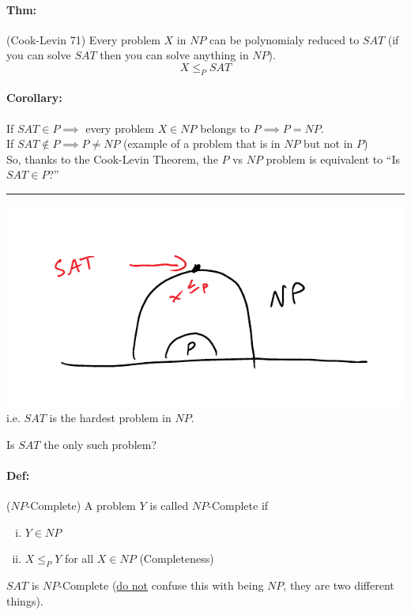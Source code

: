 \documentclass[12 pt]{article}
\begin{document}
          \paragraph{Thm:} (Cook-Levin 71) Every problem $X$ in $NP$
          can be polynomialy reduced to $SAT$ (if you can solve $SAT$
          then you can solve anything in $NP$).
          $$ X \leq_P SAT$$
          \paragraph{Corollary:} If $SAT \in P \implies$ every problem
          $X \in NP$ belongs to $P\implies P=NP$.
          \\ If $SAT\notin P \implies P \neq NP$ (example of a problem
          that is in $NP$ but not in $P$)
          \\ So, thanks to the Cook-Levin Theorem, the $P$ vs $NP$
          problem is equivalent to ``Is $SAT \in P$?''
          \\ \noindent \rule{\textwidth}{0.5pt}
          \includegraphics[width=.9\textwidth]{i124.pdf}
          \\ i.e. $SAT$ is the hardest problem in $NP$.

          Is $SAT$ the only such problem?
          \paragraph{Def:} ($NP$-Complete) A problem $Y$ is called
          $NP$-Complete if
          \begin{enumerate}[(i)]
          \item $Y \in NP$
          \item $X \leq_P Y$ for all $X\in NP$ (Completeness)
          \end{enumerate}
          $SAT$ is $NP$-Complete (\underline{do not} confuse this
          with being $NP$, they are two different things).
\end{document}
